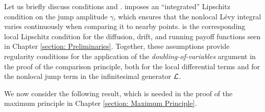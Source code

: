 Let us briefly discuss conditions  and .  imposes an ``integrated'' Lipschitz condition on the jump amplitude $\gamma$, which ensures that the nonlocal Lévy integral varies continuously when comparing it to nearby points.  is the corresponding local Lipschitz condition for the diffusion, drift, and running payoff functions seen in Chapter \ref{section: Preliminaries}. Together, these assumptions provide regularity conditions for the application of the \textit{doubling-of-variables} argument in the proof of the comparison principle, both for the local differential terms and for the nonlocal jump term in the infinitesimal generator $\mathcal{L}$.

We now consider the following result, which is needed in the proof of the maximum principle in Chapter \ref{section: Maximum Principle}. 

